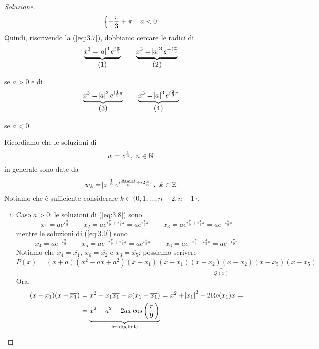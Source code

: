 \begin{proof}[Soluzione]
\[\begin{dcases}
         -\frac{\pi}{3}+\pi\, & a<0
    \end{dcases}
    \]
    Quindi, riscrivendo la (\ref{eq:3.7}), dobbiamo cercare le radici di
    \[
    \underbrace{x^3 = \abs{a}^3 e^{i\frac{\pi}{3}}}_{\stepcounter{equation}\mbox{(\theequation)}} \nonumber \qquad \underbrace{x^3 = \abs{a}^3 e^{-i\frac{\pi}{3}}}_{\stepcounter{equation}\mbox{(\theequation)}} \nonumber
    \]
    \addtocounter{equation}{-2}\label{eq:3.8}
    \addtocounter{equation}{0}\label{eq:3.9}
    se $a>0$ e di 
    \[
    \underbrace{x^3 = \abs{a}^3 e^{i\frac{4}{3}\pi}}_{\stepcounter{equation}\mbox{(\theequation)}} \nonumber \qquad \underbrace{x^3 = \abs{a}^3 e^{i\frac{2}{3}\pi}}_{\stepcounter{equation}\mbox{(\theequation)}} \nonumber
    \]
    \addtocounter{equation}{-2}\label{eq:3.10}
    \addtocounter{equation}{0}\label{eq:3.11}
    se $a<0$.
    \begin{tcolorbox}
        Ricordiamo che le soluzioni di
        \[
        w = z^{\frac{1}{n}}, \ n\in\amsbb{N}
        \]
        in generale sono date da
        \[
        w_k = \abs{z}^{\frac{1}{n}} e^{i\frac{\mathrm{Arg}(z)}{n}+i2\frac{k}{n}\pi}, \ k\in\amsbb{Z} 
        \]
        Notiamo che è sufficiente considerare $k\in\{0, 1, \dots, n-2, n-1\}$.
    \end{tcolorbox}
    \begin{enumerate}[(i)]
        \item Caso $a>0$: le soluzioni di (\ref{eq:3.8}) sono
    \[
    x_1 = {a} e^{i\frac{\pi}{9}} \qquad x_2 ={a}e^{i\frac{\pi}{9}+i\frac{2}{3}\pi} = {a} e^{i\frac{7}{9}\pi} \qquad x_3 = {a}e^{i\frac{\pi}{9}+i\frac{4}{3}\pi} = {a} e^{-i\frac{5}{9}\pi}
    \]
    mentre le soluzioni di (\ref{eq:3.9}) sono
    \[
    x_4 = {a} e^{-i\frac{\pi}{9}} \qquad x_5 ={a}e^{-i\frac{\pi}{9}+i\frac{2}{3}\pi} = {a}e^{i\frac{5}{9}\pi} \qquad x_6 = {a}e^{-i\frac{\pi}{9}+i\frac{4}{3}\pi} = {a} e^{-i\frac{7}{9}\pi}
    \]
    Notiamo che $x_4 = \overline{x_1}$, $x_6 = \overline{x_2}$ e $x_3 = \overline{x_5}$; possiamo scrivere
    \[
    P(x) = (x+a)(x^2-ax+a^2)\underbrace{(x-x_1)(x-\overline{x_1})(x-x_2)(x-\overline{x_2})(x-x_5)(x-\overline{x_5})}_{Q(x)}
    \]
    Ora,
    \[
    \begin{split}
        (x-x_1)(x-\overline{x_1}) &= x^2 + x_1 \overline{x_1}-x(x_1 + \overline{x_1}) = x^2 + \abs{x_1}^2 -2\mathrm{Re}(x_1)x = \\
        & = \underbrace{ x^2 + a^2 -2{a}x\cos\left(\frac{\pi}{9}\right)}_{\text{irriducibile}}

\end{split}\]
\end{enumerate}
\end{proof}
